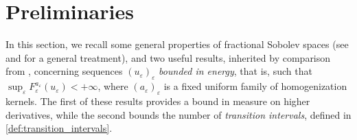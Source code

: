\documentclass{article}
\newtheorem{Proposition}[Theorem]{Proposition}
\theoremstyle{definition}
\newcommand{\de}{\mathrm{d}}
\newcommand{\N}{\mathbb{N}}
\newcommand{\e}{\varepsilon}
\newcommand{\del}{\delta}
\def\e{\varepsilon}
\begin{document}

\section{Preliminaries}
In this section, we recall some general properties of fractional Sobolev spaces (see \cite{Hitchhiker} and \cite{Leoni_frac_sob_sp} for a general treatment), and two useful results, inherited by comparison from \cite{Solci_2024}, concerning sequences $(u_\e)_\e$ \emph{bounded in energy}, that is, such that $\sup_\e F^{a_{\scriptstyle\e}}_{\e}(u_\e)<+\infty$, where $(a_\e)_\e$ is a fixed uniform family of homogenization kernels. The first of these results provides a bound in measure on higher derivatives, while the second bounds the number of \emph{transition intervals}, defined in \ref{def:transition_intervals}.


\end{document}
